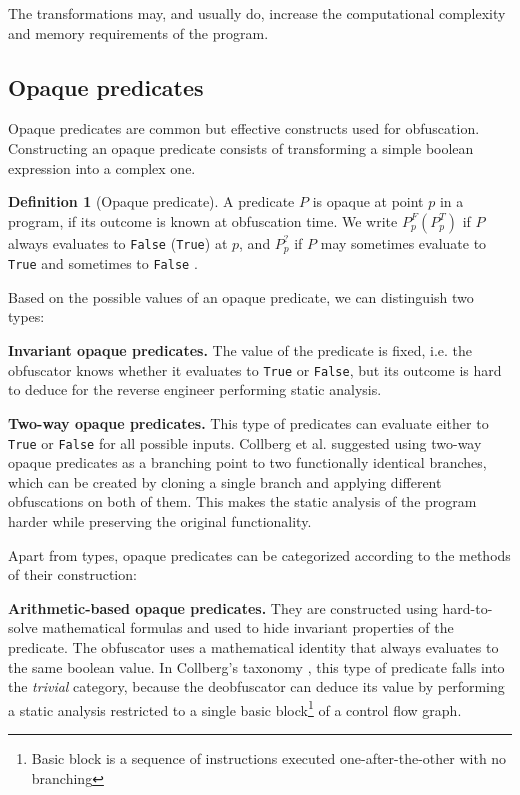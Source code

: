 \documentclass[
  digital, %
  table,   %
  twoside, %
  nolof,     %
  nolot,     %
]{fithesis3}
\theoremstyle{definition}
\newtheorem{definition}{Definition}[section]
\begin{document}
The transformations may, and usually do, increase the computational complexity and memory requirements of the program. 

\subsection{Opaque predicates} \label{opaque}
Opaque predicates are common but effective constructs used for obfuscation. Constructing an opaque predicate consists of transforming a simple boolean expression into a complex one. 

\begin{definition}[Opaque predicate]
\label{def:opaque}
A predicate $P$ is opaque at point $p$ in a program, if its outcome is known at obfuscation time. We write $P_p^F (P_p^T)$ if $P$ always evaluates to \texttt{False} (\texttt{True}) at $p$, and $P_p^?$ if $P$ may sometimes evaluate to \texttt{True} and sometimes to \texttt{False} \cite{manufacturing_opaque}.
\end{definition}

Based on the possible values of an opaque predicate, we can distinguish two types:

\textbf{Invariant opaque predicates.} The value of the predicate is fixed, i.e. the obfuscator knows whether it evaluates to \texttt{True} or \texttt{False}, but its outcome is hard to deduce for the reverse engineer performing static analysis. 

\textbf{Two-way opaque predicates.} This type of predicates can evaluate either to \texttt{True} or \texttt{False} for all possible inputs. Collberg et al. \cite{taxonomy_obf} suggested using two-way opaque predicates as a branching point to two functionally identical branches, which can be created by cloning a single branch and applying different obfuscations on both of them. This makes the static analysis of the program harder while preserving the original functionality. 

Apart from types, opaque predicates can be categorized according to the methods of their construction: 

\textbf{Arithmetic-based opaque predicates.} They are constructed using hard-to-solve mathematical formulas and used to hide invariant properties of the predicate. The obfuscator uses a mathematical identity that always evaluates to the same boolean value. In Collberg's taxonomy \cite{taxonomy_obf}, this type of predicate falls into the \textit{trivial} category, because the deobfuscator can deduce its value by performing a static analysis restricted to a single basic block\footnote{Basic block is a sequence of instructions executed one-after-the-other with no branching\cite{dragonBook}} of a control flow graph. 
\end{document}
